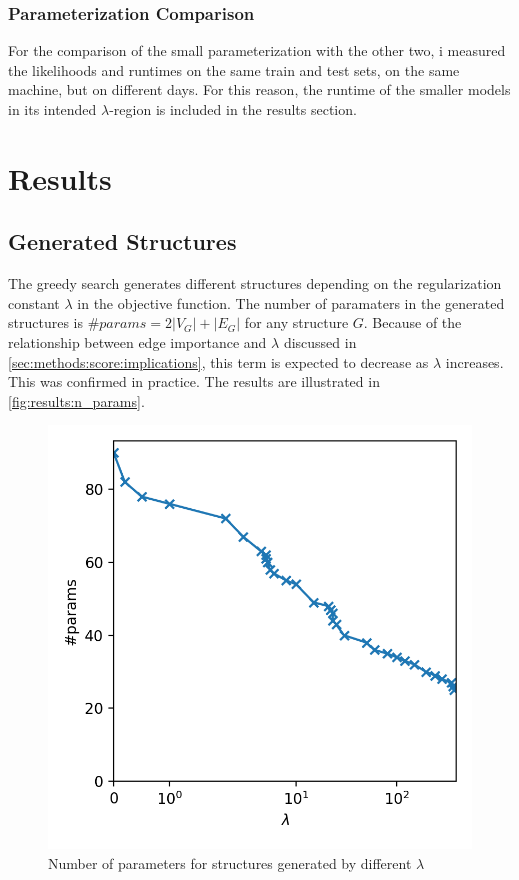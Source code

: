 \documentclass[sigconf, fleqn, prologue, dvipsnames]{acmart}
\newcommand{\abs}[1]{\left\vert #1 \right\vert}
\begin{document}
\subsubsection{Parameterization Comparison}
For the comparison of the small parameterization with the other two, i measured the likelihoods and runtimes on the same train and test sets, on the same machine, but on different days.
For this reason, the runtime of the smaller models in its intended $\lambda$-region is included in the results section.


\section{Results}
\subsection{Generated Structures}
\label{sec:results:structures}
The greedy search generates different structures depending on the regularization constant $\lambda$ in the objective function.
The number of paramaters in the generated structures is $\#params = 2 \abs{V_G} + \abs{E_G}$ for any structure $G$.
Because of the relationship between edge importance and $\lambda$ discussed in \autoref{sec:methods:score:implications}, this term is expected to decrease as $\lambda$ increases.
This was confirmed in practice. The results are illustrated in \autoref{fig:results:n_params}.
\begin{figure}
	\centering
	\includegraphics[scale=0.5]{graphics/n_params.png}
	\caption{Number of parameters for structures generated by different $\lambda$}
	\label{fig:results:n_params}
\end{figure}
\end{document}
